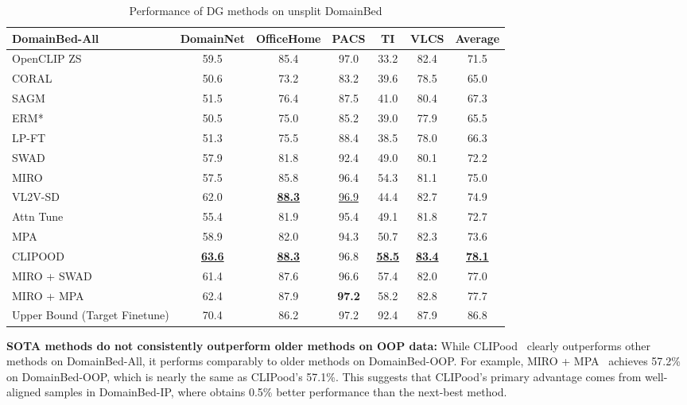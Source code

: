 \documentclass{article} %
\begin{document}
\begin{table}[H]
\begin{subtable}[t]{1\textwidth}
\centering
\begin{tabular}{lcccccc}
\toprule
\textbf{DomainBed-All} & DomainNet & OfficeHome & PACS & TI & VLCS & Average \\ \midrule
OpenCLIP ZS & 59.5  & 85.4 & 97.0 & 33.2 &  82.4 & 71.5\\ \midrule \color{black}
CORAL~\citep{sun2016deep} & 50.6 & 73.2 & 83.2 & 39.6 & 78.5 & 65.0 \\ 
SAGM~\citep{wang2019learning} & 51.5 & 76.4 & 87.5 & 41.0 & 80.4 & 67.3 \\ 
ERM*~\citep{gulrajani2020search} & 50.5 & 75.0 & 85.2 & 39.0 & 77.9 & 65.5 \\ 
LP-FT~\citep{kumar2021fine} & 51.3 & 75.5 & 88.4 & 38.5 & 78.0 & 66.3 \\ 
SWAD~\citep{cha2021swad} & 57.9 & 81.8 & 92.4 & 49.0 & 80.1 & 72.2 \\ 
MIRO~\citep{cha2022miro} & 57.5 & 85.8 & 96.4 & 54.3 & 81.1 & 75.0 \\ 
VL2V-SD~\citep{addepalli2024leveraging} & 62.0 & \underline{\textbf{88.3}} & \underline{96.9} & 44.4 & 82.7 & 74.9 \\ 
Attn Tune~\citep{teterwak2023erm++} & 55.4 & 81.9 & 95.4 & 49.1 & 81.8 & 72.7 \\ 
MPA~\citep{arpit2022ensemble} & 58.9 & 82.0 & 94.3 & 50.7 & 82.3 & 73.6 \\
CLIPOOD~\citep{shu2023clipood} & \textbf{\underline{63.6}} & \textbf{\underline{88.3}}  & 96.8  & \textbf{\underline{58.5}} & \textbf{\underline{83.4}} & \textbf{\underline{78.1}} \\
\midrule
MIRO + SWAD &  61.4 & 87.6 & 96.6 & 57.4 & 82.0 & 77.0  \\
MIRO + MPA & 62.4 & 87.9 & \textbf{97.2} & 58.2 & 82.8& 77.7 \\ \midrule
Upper Bound (Target Finetune) & 70.4 &  86.2 & 97.2 & 92.4  & 87.9 &  86.8 \\ \bottomrule

\end{tabular}
\caption{Performance of DG methods on unsplit DomainBed
}
\end{subtable}
\label{table:methods}
\end{table}


\textbf{SOTA methods do not consistently outperform older methods on OOP data:}  While CLIPood~\citep{shu2023clipood} clearly outperforms other methods on DomainBed-All, it performs comparably to older methods on DomainBed-OOP. For example, MIRO + MPA~\citep{cha2022miro,arpit2022ensemble} achieves 57.2\% on DomainBed-OOP, which is nearly the same as CLIPood's 57.1\%. This suggests that CLIPood's primary advantage comes from well-aligned samples in DomainBed-IP, where obtains 0.5\% better performance than the next-best method.
\end{document}
